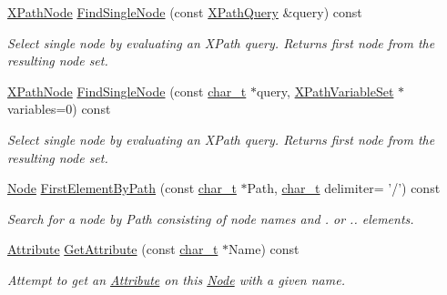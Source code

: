 \begin{DoxyCompactItemize}
\hyperlink{classphys_1_1xml_1_1XPathNode}{XPathNode} \hyperlink{classphys_1_1xml_1_1Node_a13b958f663f9605061e5e47dfd8e1966}{FindSingleNode} (const \hyperlink{classphys_1_1xml_1_1XPathQuery}{XPathQuery} \&query) const 
\begin{DoxyCompactList}\small\item\em Select single node by evaluating an XPath query. Returns first node from the resulting node set. \item\end{DoxyCompactList}\item 
\hyperlink{classphys_1_1xml_1_1XPathNode}{XPathNode} \hyperlink{classphys_1_1xml_1_1Node_a11966aa8afdfa586404393ebae9b07f5}{FindSingleNode} (const \hyperlink{namespacephys_1_1xml_afc87705cd1c2917d87b879715a2d8f6e}{char\_\-t} $\ast$query, \hyperlink{classphys_1_1xml_1_1XPathVariableSet}{XPathVariableSet} $\ast$variables=0) const 
\begin{DoxyCompactList}\small\item\em Select single node by evaluating an XPath query. Returns first node from the resulting node set. \item\end{DoxyCompactList}\item 
\hyperlink{classphys_1_1xml_1_1Node}{Node} \hyperlink{classphys_1_1xml_1_1Node_af2a9ac5c4e3252dca0e17720de093a9a}{FirstElementByPath} (const \hyperlink{namespacephys_1_1xml_afc87705cd1c2917d87b879715a2d8f6e}{char\_\-t} $\ast$Path, \hyperlink{namespacephys_1_1xml_afc87705cd1c2917d87b879715a2d8f6e}{char\_\-t} delimiter= '/') const 
\begin{DoxyCompactList}\small\item\em Search for a node by Path consisting of node names and . or .. elements. \item\end{DoxyCompactList}\item 
\hyperlink{classphys_1_1xml_1_1Attribute}{Attribute} \hyperlink{classphys_1_1xml_1_1Node_a338eeb27d2a0cf39823f228abb5d936c}{GetAttribute} (const \hyperlink{namespacephys_1_1xml_afc87705cd1c2917d87b879715a2d8f6e}{char\_\-t} $\ast$Name) const 
\begin{DoxyCompactList}\small\item\em Attempt to get an \hyperlink{classphys_1_1xml_1_1Attribute}{Attribute} on this \hyperlink{classphys_1_1xml_1_1Node}{Node} with a given name. \item\end{DoxyCompactList}\item 

\end{DoxyCompactItemize}
